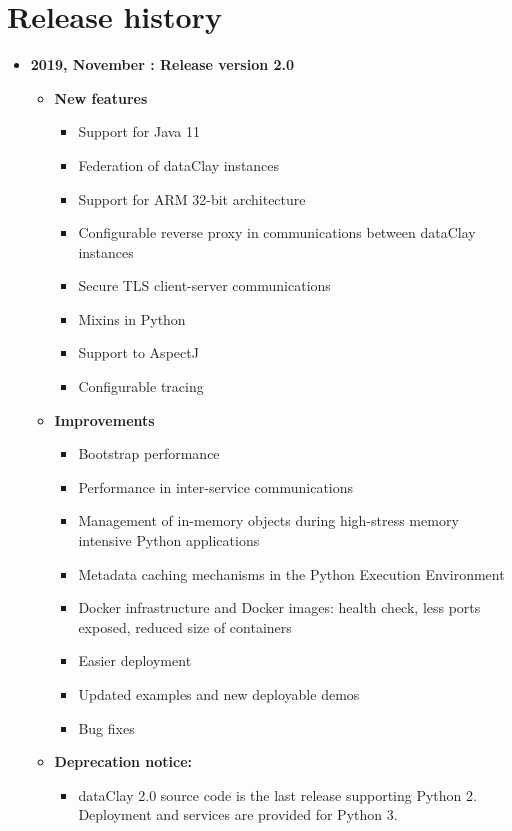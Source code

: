 \chapter*{Release history}

\begin{itemize}
\item[] \textbf{2019, November : Release version 2.0}\newline
    \begin{itemize}
    \item[] \textbf{New features}
        \begin{itemize}
            \item[] Support for Java 11
            \item[] Federation of dataClay instances
            \item[] Support for ARM 32-bit architecture
            \item[] Configurable reverse proxy in communications between dataClay instances
            \item[] Secure TLS client-server communications
            \item[] Mixins in Python
            \item[] Support to AspectJ
            \item[] Configurable tracing
        \end{itemize}
    \item[] \textbf{Improvements}
        \begin{itemize}
            \item[] Bootstrap performance
            \item[] Performance in inter-service communications
            \item[] Management of in-memory objects during high-stress memory intensive Python applications
            \item[] Metadata caching mechanisms in the Python Execution Environment
            \item[] Docker infrastructure and Docker images: health check, less ports exposed, reduced size of containers 
            \item[] Easier deployment
            \item[] Updated examples and new deployable demos
            \item[] Bug fixes
        \end{itemize}
    \item[] \textbf{Deprecation notice:}
        \begin{itemize}
            \item[] dataClay 2.0 source code is the last release supporting Python 2. Deployment and services are provided for Python 3.
        \end{itemize}
    \end{itemize}
\end{itemize}
